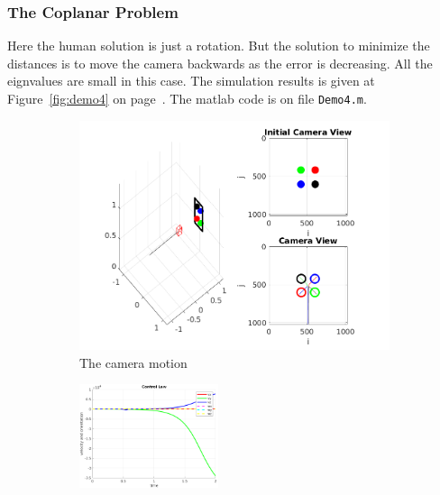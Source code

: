 \documentclass[a4paper,12pt]{article}
\begin{document}
\subsubsection{The Coplanar Problem}
Here the human solution is just a rotation. But the solution to minimize the distances is to move the camera 
backwards as the error is decreasing. All the eignvalues are small in this case. The simulation results is given at Figure~\ref{fig:demo4} on page~\pageref{fig:demo4}. The matlab code is on file \texttt{Demo4.m}.
\begin{figure}[tb!]
                 \begin{subfigure}[b]{\textwidth}         
                \centering
                 \includegraphics[width=13cm]{../results/Demo4-simulation.png}
             \caption{The camera motion}
			 \vspace{8pt}
                 \end{subfigure}
         \begin{subfigure}[b]{0.32\textwidth}
                \centering
                \includegraphics[height=1.2in]{../results/Demo4-control-law.png}
                 \end{subfigure}
         \begin{subfigure}[b]{0.2\textwidth}
                \centering

\end{subfigure}
\end{figure}
\end{document}
